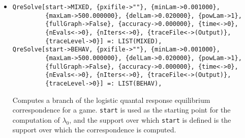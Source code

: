 \begin{itemize}
\item{}
\protect \large \begin{verbatim}
QreSolve[start->MIXED, {pxifile->""}, {minLam->0.001000}, 
         {maxLam->500.000000}, {delLam->0.020000}, {powLam->1}, 
         {fullGraph->False}, {accuracy->0.000000}, {time<->0}, 
         {nEvals<->0}, {nIters<->0}, {traceFile<->(Output)}, 
         {traceLevel->0}] =: LIST(MIXED),
QreSolve[start->BEHAV, {pxifile->""}, {minLam->0.001000}, 
         {maxLam->500.000000}, {delLam->0.020000}, {powLam->1}, 
         {fullGraph->False}, {accuracy->0.000000}, {time<->0}, 
         {nEvals<->0}, {nIters<->0}, {traceFile<->(Output)}, 
         {traceLevel->0}] =: LIST(BEHAV),
\end{verbatim}\normalsize

\bd 
Computes a branch of the logistic quantal response equilibrium
correspondence for a game. \verb+start+ is
used as the starting point for the computation of $\lambda_{0}$, and
the support over which \verb+start+ is defined is the support over
which the correspondence is computed.


\end{itemize}
